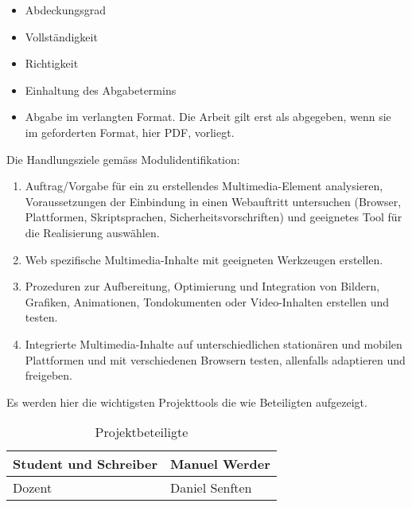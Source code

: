 \begin{itemize}
    \item Abdeckungsgrad
    \item Vollständigkeit
    \item Richtigkeit
    \item Einhaltung des Abgabetermins
    \item Abgabe im verlangten Format.
    Die Arbeit gilt erst als abgegeben, wenn sie im geforderten Format, hier PDF, vorliegt.
\end{itemize}
\newpage
{}
Die Handlungsziele gemäss Modulidentifikation:

\begin{enumerate}
    \item Auftrag/Vorgabe für ein zu erstellendes Multimedia-Element
    analysieren, Voraussetzungen der Einbindung in einen
    Webauftritt untersuchen (Browser, Plattformen, Skriptsprachen, Sicherheitsvorschriften) und geeignetes Tool
    für die Realisierung auswählen.
    \item Web spezifische Multimedia-Inhalte mit geeigneten
    Werkzeugen erstellen.
    \item Prozeduren zur Aufbereitung, Optimierung und Integration
    von Bildern, Grafiken, Animationen, Tondokumenten oder
    Video-Inhalten erstellen und testen.
    \item Integrierte Multimedia-Inhalte auf unterschiedlichen
    stationären und mobilen Plattformen und mit verschiedenen
    Browsern testen, allenfalls adaptieren und freigeben.
\end{enumerate}

Es werden hier die wichtigsten Projekttools die wie Beteiligten aufgezeigt.

\begin{table}[h!]
    \centering
    \begin{tabularx}{0.8\textwidth} {
    | >{\raggedright\arraybackslash}X
    | >{\raggedright\arraybackslash}X | }
        \hline
        \sffamily Student und Schreiber & \sffamily  Manuel Werder \\
        \hline
        \sffamily Dozent & \sffamily Daniel Senften  \\
        \hline
    \end{tabularx}
    \caption{\sffamily Projektbeteiligte}
    \label{tab:1}
\end{table}

